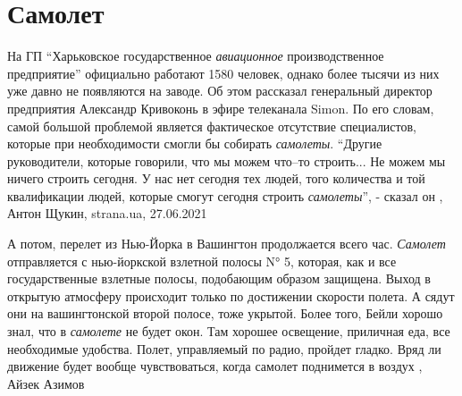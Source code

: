  
 
 
 
 
\chapter{Самолет}
\label{sec:slova.samolet}

На ГП \enquote{Харьковское государственное \emph{авиационное} производственное
предприятие} официально работают 1580 человек, однако более тысячи из них уже
давно не появляются на заводе.  Об этом рассказал генеральный директор
предприятия Александр Кривоконь в эфире телеканала Simon.  По его словам, самой
большой проблемой является фактическое отсутствие специалистов, которые при
необходимости смогли бы собирать \emph{самолеты}.  \enquote{Другие
руководители, которые говорили, что мы можем что–то строить... Не можем мы
ничего строить сегодня. У нас нет сегодня тех людей, того количества и той
квалификации людей, которые смогут сегодня строить \emph{самолеты}}, - сказал
он
, Антон Щукин, strana.ua, 27.06.2021

А потом, перелет из Нью-Йорка в Вашингтон продолжается всего час. \emph{Самолет}
отправляется с нью-йоркской взлетной полосы N° 5, которая, как и все
государственные взлетные полосы, подобающим образом защищена. Выход в открытую
атмосферу происходит только по достижении скорости полета. А сядут они на
вашингтонской второй полосе, тоже укрытой.  Более того, Бейли хорошо знал, что
в \emph{самолете} не будет окон. Там хорошее освещение, приличная еда, все
необходимые удобства. Полет, управляемый по радио, пройдет гладко. Вряд ли
движение будет вообще чувствоваться, когда самолет поднимется в воздух
, Айзек Азимов


